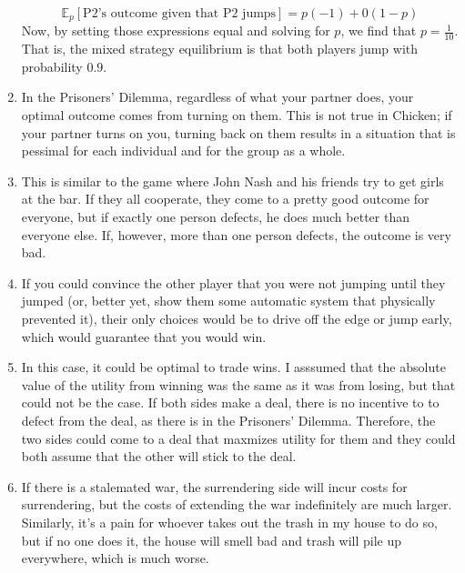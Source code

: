 \documentclass[letterpaper]{article}
\begin{document}
\begin{enumerate}
        \[
            \mathbb{E}_p[\text{P2's outcome given that P2 jumps}] = p(-1) + 0(1 - p)
        \]
        Now, by setting those expressions equal and solving for $p$, we find that $p = \frac{1}{10}$. That is, the mixed strategy equilibrium is that both players jump with probability $0.9$.
    \item In the Prisoners' Dilemma, regardless of what your partner does, your optimal outcome comes from turning on them. This is not true in Chicken; if your partner turns on you, turning back on them results in a situation that is pessimal for each individual and for the group as a whole. 
    \item This is similar to the game where John Nash and his friends try to get girls at the bar. If they all cooperate, they come to a pretty good outcome for everyone, but if exactly one person defects, he does much better than everyone else. If, however, more than one person defects, the outcome is very bad.
    \item If you could convince the other player that you were not jumping until they jumped (or, better yet, show them some automatic system that physically prevented it), their only choices would be to drive off the edge or jump early, which would guarantee that you would win.
    \item In this case, it could be optimal to trade wins. I asssumed that the absolute value of the utility from winning was the same as it was from losing, but that could not be the case. If both sides make a deal, there is no incentive to to defect from the deal, as there is in the Prisoners' Dilemma. Therefore, the two sides could come to a deal that maxmizes utility for them and they could both assume that the other will stick to the deal.
    \item If there is a stalemated war, the surrendering side will incur costs for surrendering, but the costs of extending the war indefinitely are much larger. Similarly, it's a pain for whoever takes out the trash in my house to do so, but if no one does it, the house will smell bad and trash will pile up everywhere, which is much worse. 
\end{enumerate}
\end{document}
